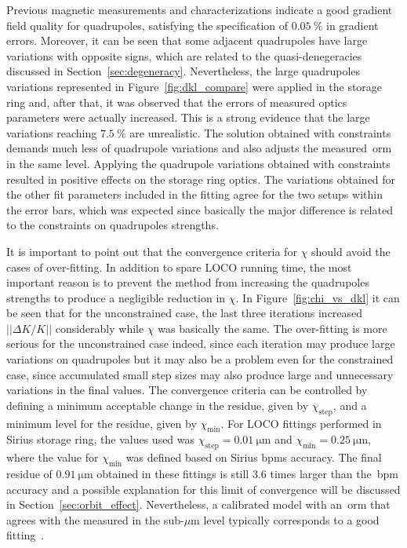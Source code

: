 Previous magnetic measurements and characterizations indicate a good gradient field quality for quadrupoles, satisfying the specification of $\SI{0.05}{\%}$ in gradient errors. Moreover, it can be seen that some adjacent quadrupoles have large variations with opposite signs, which are related to the quasi-denegeracies discussed in Section~\ref{sec:degeneracy}. Nevertheless, the large quadrupoles variations represented in Figure~\ref{fig:dkl_compare} were applied in the storage ring and, after that, it was observed that the errors of measured optics parameters were actually increased. This is a strong evidence that the large variations reaching $\SI{7.5}{\%}$ are unrealistic. The solution obtained with constraints demands much less of quadrupole variations and also adjusts the measured~\gls{orm} in the same level. Applying the quadrupole variations obtained with constraints resulted in positive effects on the storage ring optics. The variations obtained for the other fit parameters included in the fitting agree for the two setups within the error bars, which was expected since basically the major difference is related to the constraints on quadrupoles strengths.

It is important to point out that the convergence criteria for $\chi$ should avoid the cases of over-fitting. In addition to spare LOCO running time, the most important reason is to prevent the method from increasing the quadrupoles strengths to produce a negligible reduction in $\chi$. In Figure~\ref{fig:chi_vs_dkl} it can be seen that for the unconstrained case, the last three iterations increased $||\Delta K/K||$ considerably while $\chi$ was basically the same. The over-fitting is more serious for the unconstrained case indeed, since each iteration may produce large variations on quadrupoles but it may also be a problem even for the constrained case, since accumulated small step sizes may also produce large and unnecessary variations in the final values. The convergence criteria can be controlled by defining a minimum acceptable change in the residue, given by $\chi_{\mathrm{step}}$, and a minimum level for the residue, given by $\chi_{\mathrm{min}}$. For LOCO fittings performed in Sirius storage ring, the values used was $\chi_{\mathrm{step}} = \SI{0.01}{\micro\meter}$ and $\chi_{\mathrm{min}} = \SI{0.25}{\micro\meter}$, where the value for $\chi_{\mathrm{min}}$ was defined based on Sirius \glspl{bpm} accuracy. The final residue of $\SI{0.91}{\micro\meter}$ obtained in these fittings is still $3.6$ times larger than the~\gls{bpm} accuracy and a possible explanation for this limit of convergence will be discussed in Section~\ref{sec:orbit_effect}. Nevertheless, a calibrated model with an~\gls{orm} that agrees with the measured in the sub-$\mu$m level typically corresponds to a good fitting~\cite{safranek1997}.

